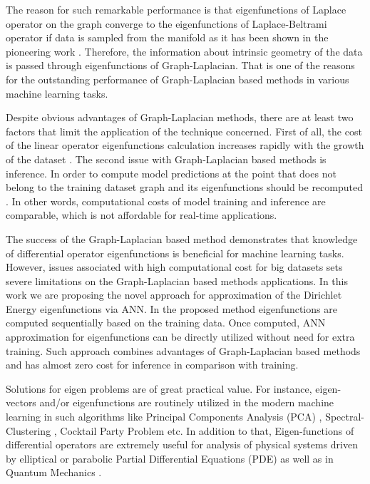 \documentclass{article}
\theoremstyle{plain}
\theoremstyle{definition}
\theoremstyle{remark}
\begin{document}
The reason for such remarkable performance is that eigenfunctions of Laplace operator on the graph converge to the eigenfunctions
of Laplace-Beltrami operator if data is sampled from the manifold as it has been shown in the pioneering work \citet{BELKIN20081289}.
Therefore, the information about intrinsic geometry of the data is passed through eigenfunctions of Graph-Laplacian.
That is one of the reasons for the outstanding performance of Graph-Laplacian based methods in various machine learning tasks.


Despite obvious advantages of Graph-Laplacian methods,
there are at least two factors that limit the application of the technique concerned.
First of all, the cost of the linear operator eigenfunctions calculation 
increases rapidly with the growth of the dataset \citet{FORD201579}.
The second issue with Graph-Laplacian based methods is inference.
In order to compute model predictions at the point that does not belong to the training dataset
graph and its eigenfunctions should be recomputed \citet{BELKIN20081289}.
In other words, computational costs of model training and inference are comparable,
which is not affordable for real-time applications.


The success of the Graph-Laplacian based method demonstrates that knowledge of differential operator eigenfunctions is beneficial
for machine learning tasks. However, issues associated with high computational cost for big datasets sets severe limitations 
on the Graph-Laplacian based methods applications.
In this work we are proposing the novel approach for approximation of the Dirichlet Energy eigenfunctions via ANN.
In the proposed method eigenfunctions are computed sequentially based on the training data.
Once computed, ANN approximation for eigenfunctions can be directly utilized without need for extra training.
Such approach combines advantages of Graph-Laplacian based methods and has almost zero cost for inference in comparison with training.


Solutions for eigen problems are of great practical value. 
For instance, eigen-vectors and/or eigenfunctions are routinely utilized in the modern machine learning in such algorithms
like Principal Components Analysis (PCA) \citet{10.1137/090771806}, Spectral-Clustering \citet{NIPS2001_801272ee},
Cocktail Party Problem \citet{8555495} etc.
In addition to that, Eigen-functions of differential operators are extremely useful for analysis of physical systems
driven by elliptical or parabolic Partial Differential Equations (PDE) \citet{10.1162/neco_a_01583}
as well as in Quantum Mechanics \citet{fermionic_neural_network_states}.
\end{document}
